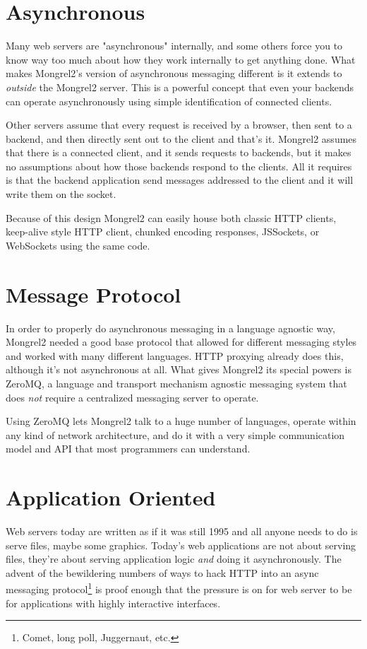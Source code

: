 \section{Asynchronous}

Many web servers are "asynchronous" internally, and some others force you to
know way too much about how they work internally to get anything done.  What makes
Mongrel2's version of asynchronous messaging different is it extends to 
\emph{outside} the Mongrel2 server.  This is a powerful concept that even your backends
can operate asynchronously using simple identification of connected clients.

Other servers assume that every request is received by a browser, then sent to a backend,
and then directly sent out to the client and that's it.  Mongrel2 assumes that there
is a connected client, and it sends requests to backends, but it makes no assumptions
about how those backends respond to the clients.  All it requires is that the backend
application send messages addressed to the client and it will write them on the
socket.

Because of this design Mongrel2 can easily house both classic HTTP clients, keep-alive
style HTTP client, chunked encoding responses, JSSockets, or WebSockets using the same
code.


\section{Message Protocol}

In order to properly do asynchronous messaging in a language agnostic way, Mongrel2
needed a good base protocol that allowed for different messaging styles and worked
with many different languages.  HTTP proxying already does this, although it's not 
asynchronous at all.  What gives Mongrel2 its special powers is ZeroMQ, a language
and transport mechanism agnostic messaging system that does \emph{not} require a 
centralized messaging server to operate.

Using ZeroMQ lets Mongrel2 talk to a huge number of languages, operate within any
kind of network architecture, and do it with a very simple communication model and
API that most programmers can understand.


\section{Application Oriented}

Web servers today are written as if it was still 1995 and all anyone needs to do
is serve files, maybe some graphics.  Today's web applications are not about serving
files, they're about serving application logic \emph{and} doing it asynchronously.
The advent of the bewildering numbers of ways to hack HTTP into an async messaging
protocol\footnote{Comet, long poll, Juggernaut, etc.} is proof enough that the 
pressure is on for web server to be for applications with highly interactive
interfaces.


